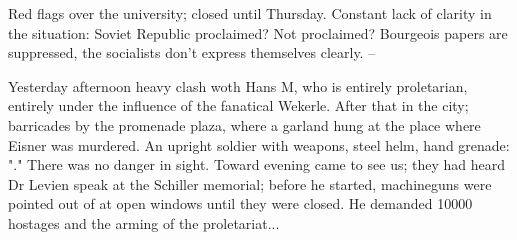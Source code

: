 
Red flags over the university; closed until Thursday. Constant lack of clarity in the situation: Soviet Republic proclaimed? Not proclaimed? Bourgeois papers are suppressed, the socialists don't express themselves clearly. --

Yesterday afternoon heavy clash woth Hans M, who is entirely proletarian, entirely under the influence of the fanatical Wekerle. After that in the city; barricades by the promenade plaza, where a garland hung at the place where Eisner was murdered. An upright soldier with weapons, steel helm, hand grenade: "." There was no danger in sight. Toward evening  came to see us; they had heard Dr Levien speak at the Schiller memorial; before he started, machineguns were pointed out of at open windows until they were closed. He demanded 10000 hostages and the arming of the proletariat... \missing